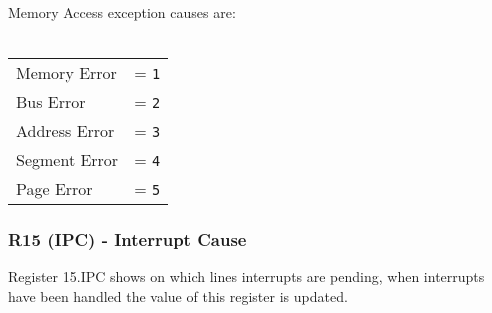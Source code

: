 Memory Access exception causes are:
\\
\\
\begin{tabular}{ll}
Memory Error & = \texttt{1}\\
Bus Error & = \texttt{2}\\
Address Error & = \texttt{3}\\
Segment Error & = \texttt{4}\\
Page Error & = \texttt{5}\\
\end{tabular}

\subsubsection{R15 (IPC) - Interrupt Cause}
Register 15.IPC shows on which lines interrupts are pending, when interrupts have been handled the value of this register is updated.
